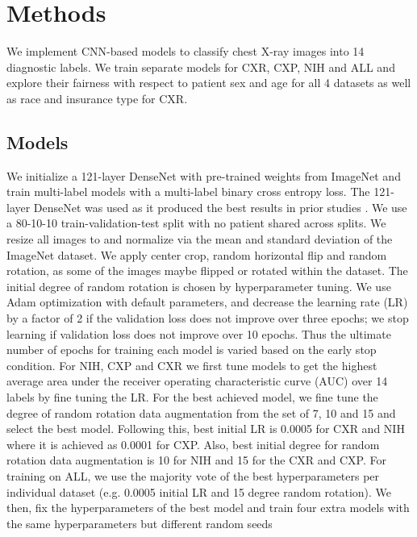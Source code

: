 \documentclass{ws-procs11x85}
\begin{document}
\section{Methods} 
\label{sec:Methods}

We implement CNN-based models to classify chest X-ray images into 14 diagnostic labels. We train separate models for CXR,\cite{johnson_mimic-cxr:_2019} CXP,\cite{irvin_chexpert:_2019} NIH  \cite{wang_chestx-ray8:_2017} and ALL and explore their fairness with respect to patient sex and age for all 4 datasets as well as race and insurance type for CXR. 

\subsection{Models}

We initialize a 121-layer DenseNet\cite{huang_densely_2017} with pre-trained weights from ImageNet\cite{imagenet_cvpr09} and train multi-label models with a multi-label binary cross entropy loss. The 121-layer DenseNet was used as it produced the best results in prior studies \cite{irvin_chexpert:_2019, rajpurkar_deep_2018} . We use a 80-10-10 train-validation-test split with no patient shared across splits. We resize all images to  and normalize via the mean and standard deviation of the ImageNet dataset.\cite{imagenet_cvpr09} We apply center crop, random horizontal flip and random rotation, as some of the images maybe flipped or rotated within the dataset. The initial degree of random rotation is chosen by hyperparameter tuning.
We use Adam \cite{adam} optimization with default parameters, and decrease the learning rate (LR) by a factor of 2 if the validation loss does not improve over three epochs; we stop learning if validation loss does not improve over 10 epochs. Thus the ultimate  number of epochs for training each model is varied based on the early stop condition.  For NIH, CXP and CXR we first tune models to get the highest average area under the receiver operating characteristic curve (AUC) over 14 labels by fine tuning the LR. For the best achieved model, we fine tune the degree of random rotation data augmentation from the set of 7, 10 and 15 and select the best model. Following this, best initial LR is 0.0005 for CXR and NIH where it is achieved as 0.0001 for CXP. Also, best initial degree for random rotation data augmentation is 10 for NIH and 15 for the CXR and CXP.
For training on ALL, we use the majority vote of the best hyperparameters per individual dataset (e.g. 0.0005 initial LR and 15 degree random rotation). We then, fix the hyperparameters of the best model and train four extra models with the same hyperparameters but different random seeds
\end{document}
